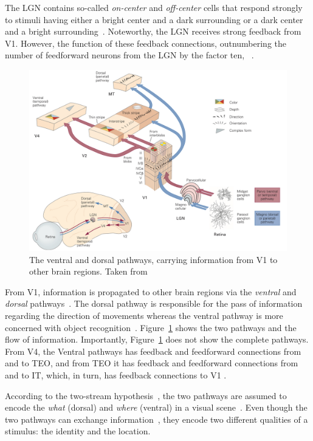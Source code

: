 The \ac{LGN} contains so-called \textit{on-center} and \textit{off-center} cells that respond strongly to stimuli having either a bright center and a dark surrounding or a dark center and a bright surrounding~\citep[pp. 564-566]{mack2013principles}.
Noteworthy, the \ac{LGN} receives strong feedback from \ac{V1}.
However, the function of these feedback connections, outnumbering the number of feedforward neurons from the \ac{LGN} by the factor ten, ~\citep[p. 573]{mack2013principles}.

\begin{figure}
    \centering
    \includegraphics[width=.8\textwidth]{images/ventral_dorsal.jpeg}
    \caption[Ventral and dorsal pathways]{The ventral and dorsal pathways, carrying information from \ac{V1} to other brain regions. Taken from \citet[p. 571]{mack2013principles}}
    \label{fig:ventral_dorsal_pathway}
\end{figure}

From \ac{V1}, information is propagated to other brain regions via the \textit{ventral} and \textit{dorsal} pathways~\citep[pp. 563, 563]{mack2013principles}.
The dorsal pathway is responsible for the pass of information regarding the direction of movements whereas the ventral pathway is more concerned with object recognition~\citep[p. 564]{mack2013principles}.
Figure~\ref{fig:ventral_dorsal_pathway} shows the two pathways and the flow of information.
Importantly, Figure~\ref{fig:ventral_dorsal_pathway} does not show the complete pathways.
From V4, the Ventral pathways has feedback and feedforward connections from and to \ac{TEO}, and from \ac{TEO} it has feedback and feedforward connections from and to \ac{IT}, which, in turn, has feedback connections to \ac{V1} \citep[p. 563]{mack2013principles}.

According to the two-stream hypothesis~\citep{goodale1992separate}, the two pathways are assumed to encode the \textit{what} (dorsal) and \textit{where} (ventral) in a visual scene~\citep[p. 520]{mack2013principles}.
Even though the two pathways can exchange information~\citep[p. 564]{mack2013principles}, they encode two different qualities of a stimulus: the identity and the location.

